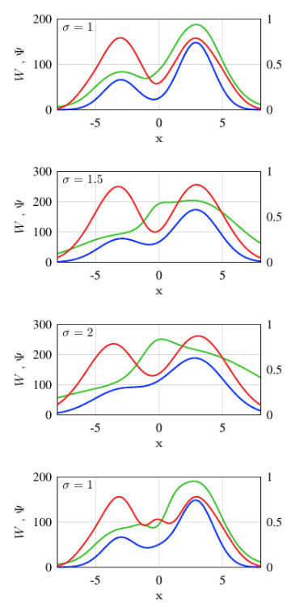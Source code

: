 \documentclass[preprint,12pt]{elsarticle}
\begin{document}
\begin{figure}[t]
\centering
\begin{subfigure}{.32\linewidth}{\includegraphics[width=1\linewidth]{fig1a.pdf}}\end{subfigure}
\begin{subfigure}{.32\linewidth}{\includegraphics[width=1\linewidth]{fig1b.pdf}}\end{subfigure}
\begin{subfigure}{.32\linewidth}{\includegraphics[width=1\linewidth]{fig1c.pdf}}\end{subfigure}
\begin{subfigure}{.32\linewidth}{\includegraphics[width=1\linewidth]{fig1d.pdf}}\end{subfigure}

\end{figure}
\end{document}
